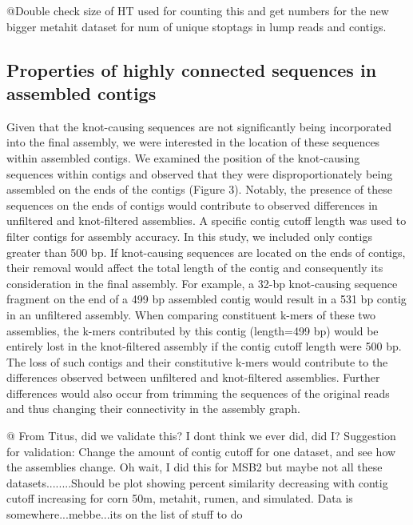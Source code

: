 \documentclass[11pt]{article} %
\begin{document}
@Double check size of HT used for counting this and get numbers for the new bigger metahit dataset for num of unique stoptags in lump reads and contigs.
\subsection{Properties of highly connected sequences in assembled contigs}

Given that the knot-causing sequences are not significantly being incorporated into the final assembly, we were interested in the location of these sequences within assembled contigs.  We examined the position of the knot-causing sequences within contigs and observed that they were disproportionately being assembled on the ends of the contigs (Figure 3).  Notably, the presence of these sequences on the ends of contigs would contribute to observed differences in unfiltered and knot-filtered assemblies.  A specific contig cutoff length was used to filter contigs for assembly accuracy.  In this study, we included only contigs greater than 500 bp.  If knot-causing sequences are located on the ends of contigs, their removal would affect the total length of the contig and consequently its consideration in the final assembly.  For example, a 32-bp knot-causing sequence fragment on the end of a 499 bp assembled contig would result in a 531 bp contig in an unfiltered assembly.  When comparing constituent k-mers of these two assemblies, the k-mers contributed by this contig (length=499 bp) would be entirely lost in the knot-filtered assembly if the contig cutoff length were 500 bp.  The loss of such contigs and their constitutive k-mers would contribute to the differences observed between unfiltered and knot-filtered assemblies.  Further differences would also occur from trimming the sequences of the original reads and thus changing their connectivity in the assembly graph.  

@ From Titus, did we validate this?  I dont think we ever did, did I?  Suggestion for validation:  Change the amount of contig cutoff for one dataset, and see how the assemblies change.  Oh wait, I did this for MSB2 but maybe not all these datasets........Should be plot showing percent similarity decreasing with contig cutoff increasing for corn 50m, metahit, rumen, and simulated.   Data is somewhere...mebbe...its on the list of stuff to do
\end{document}
